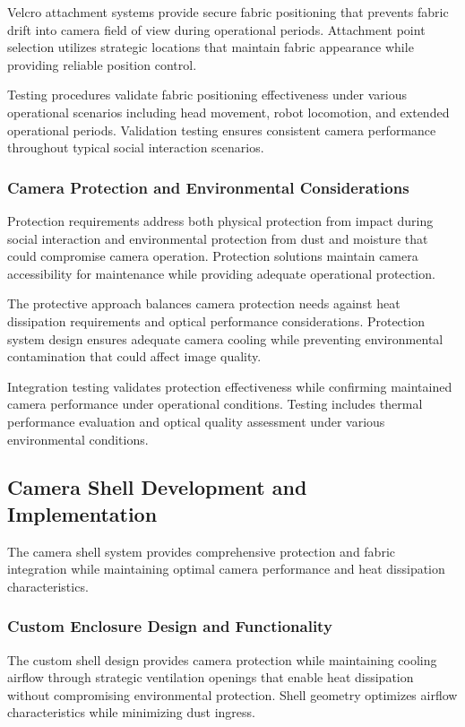 Velcro attachment systems provide secure fabric positioning that prevents fabric drift into camera field of view during operational periods. Attachment point selection utilizes strategic locations that maintain fabric appearance while providing reliable position control.

Testing procedures validate fabric positioning effectiveness under various operational scenarios including head movement, robot locomotion, and extended operational periods. Validation testing ensures consistent camera performance throughout typical social interaction scenarios.

\subsubsection{Camera Protection and Environmental Considerations}

Protection requirements address both physical protection from impact during social interaction and environmental protection from dust and moisture that could compromise camera operation. Protection solutions maintain camera accessibility for maintenance while providing adequate operational protection.

The protective approach balances camera protection needs against heat dissipation requirements and optical performance considerations. Protection system design ensures adequate camera cooling while preventing environmental contamination that could affect image quality.

Integration testing validates protection effectiveness while confirming maintained camera performance under operational conditions. Testing includes thermal performance evaluation and optical quality assessment under various environmental conditions.

\subsection{Camera Shell Development and Implementation}

The camera shell system provides comprehensive protection and fabric integration while maintaining optimal camera performance and heat dissipation characteristics.

\subsubsection{Custom Enclosure Design and Functionality}

The custom shell design provides camera protection while maintaining cooling airflow through strategic ventilation openings that enable heat dissipation without compromising environmental protection. Shell geometry optimizes airflow characteristics while minimizing dust ingress.

